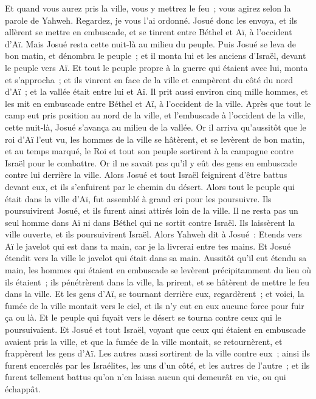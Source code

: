 \begin{multicols}{2}
Et quand vous aurez pris la ville, vous y mettrez le feu~; vous agirez selon la parole de Yahweh. Regardez, je vous l'ai ordonné.
Josué donc les envoya, et ils allèrent se mettre en embuscade, et se tinrent entre Béthel et Aï, à l'occident d'Aï. Mais Josué resta cette nuit-là au milieu du peuple.
Puis Josué se leva de bon matin, et dénombra le peuple~; et il monta lui et les anciens d'Israël, devant le peuple vers Aï.
Et tout le peuple propre à la guerre qui étaient avec lui, monta et s'approcha~; et ils vinrent en face de la ville et campèrent du côté du nord d'Aï~; et la vallée était entre lui et Aï.
Il prit aussi environ cinq mille hommes, et les mit en embuscade entre Béthel et Aï, à l'occident de la ville.
Après que tout le camp eut pris position au nord de la ville, et l'embuscade à l'occident de la ville, cette nuit-là, Josué s'avança au milieu de la vallée.
Or il arriva qu'aussitôt que le roi d'Aï l'eut vu, les hommes de la ville se hâtèrent, et se levèrent de bon matin, et au temps marqué, le Roi et tout son peuple sortirent à la campagne contre Israël pour le combattre. Or il ne savait pas qu'il y eût des gens en embuscade contre lui derrière la ville.
Alors Josué et tout Israël feignirent d'être battus devant eux, et ils s'enfuirent par le chemin du désert.
Alors tout le peuple qui était dans la ville d'Aï, fut assemblé à grand cri pour les poursuivre. Ils poursuivirent Josué, et ils furent ainsi attirés loin de la ville.
Il ne resta pas un seul homme dans Aï ni dans Béthel qui ne sortit contre Israël. Ils laissèrent la ville ouverte, et ils poursuivirent Israël.
Alors Yahweh dit à Josué~: Etends vers Aï le javelot qui est dans ta main, car je la livrerai entre tes mains. Et Josué étendit vers la ville le javelot qui était dans sa main.
Aussitôt qu'il eut étendu sa main, les hommes qui étaient en embuscade se levèrent précipitamment du lieu où ils étaient~; ils pénétrèrent dans la ville, la prirent, et se hâtèrent de mettre le feu dans la ville.
Et les gens d'Aï, se tournant derrière eux, regardèrent~; et voici, la fumée de la ville montait vers le ciel, et ils n'y eut en eux aucune force pour fuir ça ou là. Et le peuple qui fuyait vers le désert se tourna contre ceux qui le poursuivaient.
Et Josué et tout Israël, voyant que ceux qui étaient en embuscade avaient pris la ville, et que la fumée de la ville montait, se retournèrent, et frappèrent les gens d'Aï.
Les autres aussi sortirent de la ville contre eux~; ainsi ils furent encerclés par les Israélites, les uns d'un côté, et les autres de l'autre~; et ils furent tellement battus qu'on n'en laissa aucun qui demeurât en vie, ou qui échappât.

\end{multicols}
